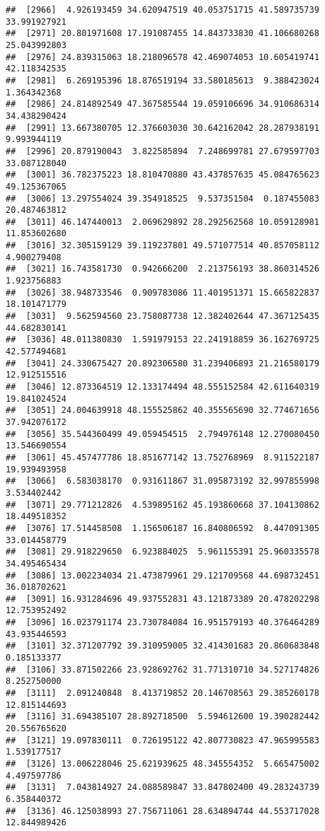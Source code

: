 \documentclass[
]{article}
\begin{document}
\begin{verbatim}
##  [2966]  4.926193459 34.620947519 40.053751715 41.589735739 33.991927921
##  [2971] 20.801971608 17.191087455 14.843733830 41.106680268 25.043992803
##  [2976] 24.839315063 18.218096578 42.469074053 10.605419741 42.118342535
##  [2981]  6.269195396 18.876519194 33.580185613  9.388423024  1.364342368
##  [2986] 24.814892549 47.367585544 19.059106696 34.910686314 34.438290424
##  [2991] 13.667380705 12.376603030 30.642162042 28.287938191  9.993944119
##  [2996] 20.879190043  3.822585894  7.248699781 27.679597703 33.087128040
##  [3001] 36.782375223 18.810470880 43.437857635 45.084765623 49.125367065
##  [3006] 13.297554024 39.354918525  9.537351504  0.187455083 20.487463812
##  [3011] 46.147440013  2.069629892 28.292562568 10.059128981 11.853602680
##  [3016] 32.305159129 39.119237801 49.571077514 40.857058112  4.900279408
##  [3021] 16.743581730  0.942666200  2.213756193 38.860314526  1.923756883
##  [3026] 38.948733546  0.909783086 11.401951371 15.665822837 18.101471779
##  [3031]  9.562594560 23.758087738 12.382402644 47.367125435 44.682830141
##  [3036] 48.011380830  1.591979153 22.241918859 36.162769725 42.577494681
##  [3041] 24.330675427 20.892306580 31.239406893 21.216580179 12.912515516
##  [3046] 12.873364519 12.133174494 48.555152584 42.611640319 19.841024524
##  [3051] 24.004639918 48.155525862 40.355565690 32.774671656 37.942076172
##  [3056] 35.544360499 49.059454515  2.794976148 12.270080450 13.546690554
##  [3061] 45.457477786 18.851677142 13.752768969  8.911522187 19.939493958
##  [3066]  6.583038170  0.931611867 31.095873192 32.997855998  3.534402442
##  [3071] 29.771212826  4.539895162 45.193860668 37.104130862 18.449518352
##  [3076] 17.514458508  1.156506187 16.840806592  8.447091305 33.014458779
##  [3081] 29.918229650  6.923884025  5.961155391 25.960335578 34.495465434
##  [3086] 13.002234034 21.473879961 29.121709568 44.698732451 36.018702621
##  [3091] 16.931284696 49.937552831 43.121873389 20.478202298 12.753952492
##  [3096] 16.023791174 23.730784084 16.951579193 40.376464289 43.935446593
##  [3101] 32.371207792 39.310959005 32.414301683 20.860683848  0.185133377
##  [3106] 33.871502266 23.928692762 31.771310710 34.527174826  8.252750000
##  [3111]  2.091240848  8.413719852 20.146708563 29.385260178 12.815144693
##  [3116] 31.694385107 28.892718500  5.594612600 19.390282442 20.556765620
##  [3121] 19.097830111  0.726195122 42.807730823 47.965995583  1.539177517
##  [3126] 13.006228046 25.621939625 48.345554352  5.665475002  4.497597786
##  [3131]  7.043814927 24.088589847 33.847802400 49.283243739  6.358440372
##  [3136] 46.125038993 27.756711061 28.634894744 44.553717028 12.844989426

\end{verbatim}
\end{document}
